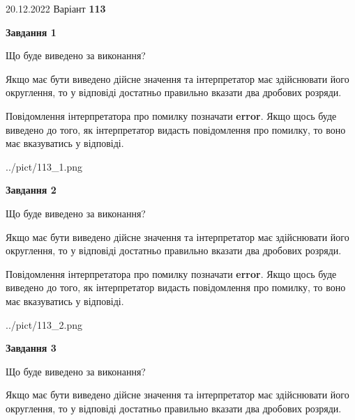 \documentclass[12pt, ukrainian]{article}
\begin{document}
{20.12.2022 Варіант \No \textbf { 113 }\par}
{
\begin {Large}

{\begin {center}\textbf{Завдання 1}\end {center}}\par
Що буде виведено за виконання? \par

Якщо має бути виведено дійсне значення та інтерпретатор має здійснювати його округлення, 
то у відповіді достатньо правильно вказати два дробових розряди.

Повідомлення інтерпретатора про помилку позначати \textbf{error}.
Якщо щось буде виведено до того, як інтерпретатор видасть повідомлення про помилку, 
то воно має вказуватись у відповіді. \par

\begin{center}
	{../pict/113_1.png}
\end{center}
\newpage

{\begin {center}\textbf{Завдання 2}\end {center}}\par
Що буде виведено за виконання? \par

Якщо має бути виведено дійсне значення та інтерпретатор має здійснювати його округлення, 
то у відповіді достатньо правильно вказати два дробових розряди.

Повідомлення інтерпретатора про помилку позначати \textbf{error}.
Якщо щось буде виведено до того, як інтерпретатор видасть повідомлення про помилку, 
то воно має вказуватись у відповіді. \par

\begin{center}
	{../pict/113_2.png}
\end{center}
\newpage

{\begin {center}\textbf{Завдання 3}\end {center}}\par
Що буде виведено за виконання? \par

Якщо має бути виведено дійсне значення та інтерпретатор має здійснювати його округлення, 
то у відповіді достатньо правильно вказати два дробових розряди.


\end{Large}}
\end{document}
